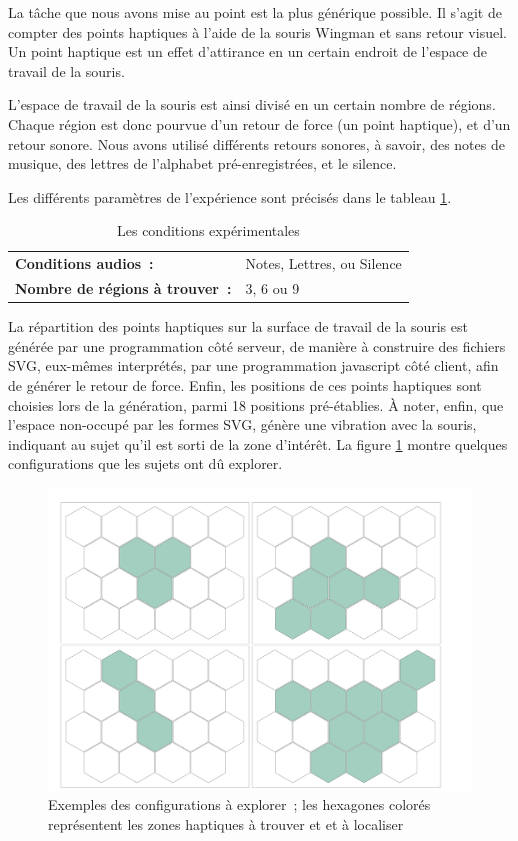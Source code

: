 \documentclass[
]{book}
\begin{document}
La tâche que nous avons mise au point est la plus générique possible. Il
s'agit de compter des points haptiques à l'aide de la souris Wingman et sans
retour visuel. Un point haptique est un effet d'attirance en un certain
endroit de l'espace de travail de la souris.

L'espace de travail de la souris est ainsi divisé en un certain nombre de
régions. Chaque région est donc pourvue d'un retour de force (un point
haptique), et d'un retour sonore. Nous avons utilisé différents retours
sonores, à savoir, des notes de musique, des lettres de l'alphabet
pré-enregistrées, et le silence.

Les différents paramètres de l'expérience sont précisés dans le
tableau \ref{tab:conditions}.

\begin{longtable}[]{@{}ll@{}}
\caption{\label{tab:conditions} Les conditions expérimentales}\tabularnewline
\toprule()
\endhead
\textbf{Conditions audios~:} & Notes, Lettres, ou Silence \\
\textbf{Nombre de régions à trouver~:} & 3, 6 ou 9 \\
\bottomrule()
\end{longtable}

La répartition des points haptiques sur la surface de travail de la souris
est générée par une programmation côté serveur, de manière à construire des
fichiers SVG, eux-mêmes interprétés, par une programmation javascript côté
client, afin de générer le retour de force. Enfin, les positions de ces
points haptiques sont choisies lors de la génération, parmi 18 positions
pré-établies. À noter, enfin, que l'espace non-occupé par les formes SVG,
génère une vibration avec la souris, indiquant au sujet qu'il est sorti de la
zone d'intérêt. La figure \ref{fig:configurations}
montre quelques configurations que les sujets ont dû explorer.

\begin{figure}
\centering
\includegraphics{img/hick1.svg}
\caption{\label{fig:configurations}Exemples des
configurations à explorer~; les hexagones colorés représentent
les zones haptiques à trouver et et à localiser}
\end{figure}
\end{document}
